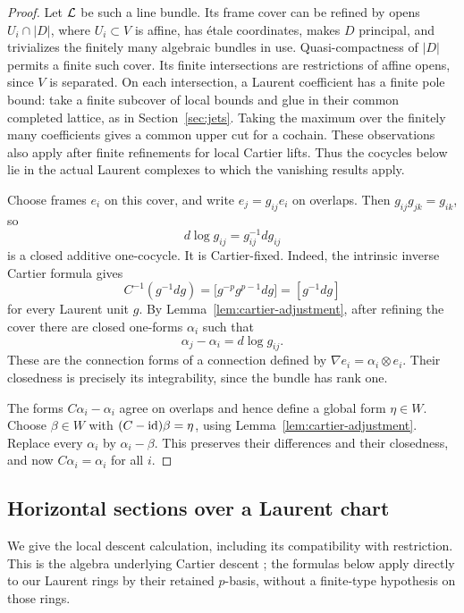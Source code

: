 \begin{proof}
Let \(\mathcal L\) be such a line bundle.  Its frame cover can be
refined by opens \(U_i\cap|D|\), where \(U_i\subset V\) is
affine, has \'etale coordinates, makes \(D\) principal, and
trivializes the finitely many algebraic bundles in use.
Quasi-compactness of \(|D|\) permits a finite such cover.
Its finite intersections are restrictions of affine opens,
since \(V\) is separated.  On each intersection, a Laurent
coefficient has a finite pole bound: take a finite subcover
of local bounds and glue in their common completed lattice,
as in Section~\ref{sec:jets}.  Taking the maximum over the
finitely many coefficients gives a common upper cut for a
cochain.  These observations also apply after finite refinements
for local Cartier lifts.  Thus the cocycles below lie in the
actual Laurent complexes to which the vanishing results apply.

Choose frames \(e_i\) on this cover, and write
\(e_j=g_{ij}e_i\) on overlaps.
Then \(g_{ij}g_{jk}=g_{ik}\), so
\[
 d\log g_{ij}=g_{ij}^{-1}dg_{ij}
\]
is a closed additive one-cocycle.  It is Cartier-fixed.  Indeed,
the intrinsic inverse Cartier formula gives
\[
 C^{-1}(g^{-1}dg)
  =\bigl[g^{-p}g^{p-1}dg\bigr]=[g^{-1}dg]
\]
for every Laurent unit \(g\).
By Lemma~\ref{lem:cartier-adjustment}, after refining the cover
there are closed one-forms \(\alpha_i\) such that
\[
 \alpha_j-\alpha_i=d\log g_{ij}.
\]
These are the connection forms of a connection defined by
\(\nabla e_i=\alpha_i\otimes e_i\).  Their closedness is
precisely its integrability, since the bundle has rank one.

The forms \(C\alpha_i-\alpha_i\) agree on overlaps and hence
define a global form \(\eta\in W\).  Choose \(\beta\in W\)
with \((C-\operatorname{id})\beta=\eta\), using
Lemma~\ref{lem:cartier-adjustment}.  Replace every \(\alpha_i\)
by \(\alpha_i-\beta\).  This preserves their differences and
their closedness, and now \(C\alpha_i=\alpha_i\) for all \(i\).
\end{proof}

\subsection{Horizontal sections over a Laurent chart}

We give the local descent calculation, including its compatibility
with restriction.  This is the algebra underlying Cartier descent
\cite[Theorem~5.1 and formulas~(5.1.2)--(5.1.7)]{katz1970};
the formulas below apply directly to
our Laurent rings by their retained \(p\)-basis, without a
finite-type hypothesis on those rings.

